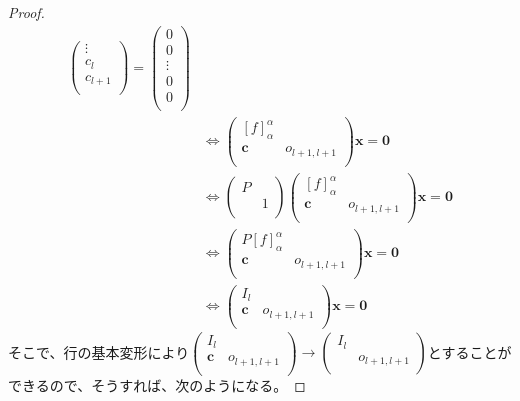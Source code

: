 \documentclass[dvipdfmx]{jsarticle}
\begin{document}
\begin{proof}
\begin{align*}
\begin{pmatrix}
 \vdots \\
c_{l} \\
c_{l + 1} \\
\end{pmatrix} = \begin{pmatrix}
0 \\
0 \\
 \vdots \\
0 \\
0 \\
\end{pmatrix}\\
&\Leftrightarrow \begin{pmatrix}
[ f]_{\alpha}^{\alpha} & \  \\
\mathbf{c} & o_{l + 1,l + 1} \\
\end{pmatrix}\mathbf{x} = \mathbf{0}\\
&\Leftrightarrow \begin{pmatrix}
P & \  \\
\  & 1 \\
\end{pmatrix}\begin{pmatrix}
[ f]_{\alpha}^{\alpha} & \  \\
\mathbf{c} & o_{l + 1,l + 1} \\
\end{pmatrix}\mathbf{x} = \mathbf{0}\\
&\Leftrightarrow \begin{pmatrix}
P[ f]_{\alpha}^{\alpha} & \  \\
\mathbf{c} & o_{l + 1,l + 1} \\
\end{pmatrix}\mathbf{x} = \mathbf{0}\\
&\Leftrightarrow \begin{pmatrix}
I_{l} & \  \\
\mathbf{c} & o_{l + 1,l + 1} \\
\end{pmatrix}\mathbf{x} = \mathbf{0}
\end{align*}
そこで、行の基本変形により$\begin{pmatrix}
I_{l} & \  \\
\mathbf{c} & o_{l + 1,l + 1} \\
\end{pmatrix} \rightarrow \begin{pmatrix}
I_{l} & \  \\
\mathbf{\ } & o_{l + 1,l + 1} \\
\end{pmatrix}$とすることができるので、そうすれば、次のようになる。

\end{proof}
\end{document}
